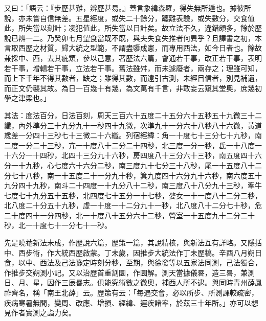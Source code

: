 \begin{pinyinscope}
又曰：「語云：『步歷甚難，辨歷甚易。』蓋言象緯森羅，得失無所遁也。據彼所說，亦未嘗自信無差。五星經度，或失二十餘分，躔離表驗，或失數分，交食值此，所失當以刻計；凌犯值此，所失當以日計矣。故立法不久，違錯頗多，餘於歷說已辨一二。乃癸卯七月望食當既不既，與夫失食失推者何異乎？且譯書之初，本言取西歷之材質，歸大統之型範，不謂盡隳成憲，而專用西法，如今日者也。餘故兼採中、西，去其疵類，參以己意，著歷法六篇，會通若干事，改正若干事，表明若干事，增輯若干事，立法若干事。舊法雖舛，而未遽廢者，兩存之；理雖可知，而上下千年不得其數者，缺之；雖得其數，而遠引古測，未經目信者，別見補遺，而正文仍襲其故。為日一百幾十有幾，為文萬有千言，非敢妄云窺其堂奧，庶幾初學之津梁也。」

其法：度法百分，日法百刻，周天三百六十五度二十五分六十五秒五十九微三十二纖，內外準分三十九分九十一秒四十九微，次準九十一分六十八秒八十六微，黃道歲差一分四十三秒七十三微二十六纖。列宿經緯：角一十度七十三分七十九秒，南二度一分二十三秒，亢一十度八十二分二十四秒，北三度一分一秒，氐一十八度一十六分一十四秒，北四十三分九十六秒，房四度八十三分六十三秒，南五度四十六分一十九秒，心七度六十六分二秒，南三度九十七分三十八秒，尾一十五度八十二分七十八秒，南一十五度二十一分九十秒，箕九度四十六分九十六秒，南六度五十九分四十九秒，南斗二十四度一十九分八十二秒，南三度八十八分九十三秒，牽牛七度七十九分五十五秒，北四度七十五分一十七秒，婺女一十一度八十二分二秒，北八度二十分五十九秒，虛一十度一十二分九十一秒，北八度八十二分七十秒，危二十度四十一分四秒，北一十度八十五分六十二秒，營室一十五度九十二分二十秒，北一十度七十一分七十一秒。

先是曉菴新法未成，作歷說六篇，歷策一篇，其說精核，與新法互有詳略。又隱括中、西步術，作大統西歷啟蒙。丁未歲，因推步大統法作丁未歷稿。辛酉八月朔日食，以中、西法及己法豫定時刻分秒，至期，與徐發等以五家法同測，己法獨合，作推步交朔測小記。又以治歷首重割圜，作圜解。測天當據儀晷，造三晷，兼測日、月、星，因作三辰晷志。俱能究術數之微奧，補西人所不逮。與同時青州薛鳳祚齊名，稱「南王北薛」云。歷策有云：「每遇交會，必以所步、所測課較疏密，疾病寒暑無間，變周、改應、增損、經緯、遲疾諸率，於茲三十年所。」亦可以想見作者實測之詣力矣。


\end{pinyinscope}
